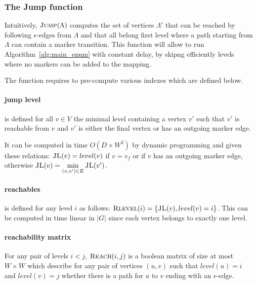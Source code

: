 \documentclass[11px]{article}
\theoremstyle{definition}
\begin{document}
      \subsubsection{The Jump function}

        Intuitively, $\Call{Jump}{\Lambda}$ computes the set of vertices
        $\Lambda'$ that can be reached by following $\epsilon$-edges from
        $\Lambda$ and that all belong first level where a path starting from
        $\Lambda$ can contain a marker transition. This function will allow to
        run Algorithm~\ref{alg:main_enum} with constant delay, by skipng
        efficiently levels where no markers can be added to the mapping.

        The  function requires to pre-compute various indexes
        which are defined below.

        \paragraph{jump level}

           is defined for all $v \in V$ the minimal level
          containing a vertex $v'$ such that $v'$ is reachable from $v$ and
          $v'$ is either the final vertex or has an outgoing marker edge.

          It can be computed in time $O(D \times W^2)$ by dynamic programming
          and given these relations: $\Call{JL}{v} = level(v)$ if $v = v_f$ or
          if $v$ has an outgoing marker edge, otherwise $\Call{JL}{v} =
          \min\limits_{(v, v') \in E} \Call{JL}{v'}$.

        \paragraph{reachables}

           is defined for any level $i$ as follows:
          $\Call{Rlevel}{i} = \{\Call{JL}{v}, level(v) = i\}$. This can be
          computed in time linear in $|G|$ since each vertex belongs to exactly
          one level.

        \paragraph{reachability matrix}

          For any pair of levels $i < j$, $\Call{Reach}{i,j}$ is a boolean
          matrix of size at most $W \times W$ which describe for any pair of
          vertices $(u, v)$ such that $level(u) = i$ and $level(v) = j$ whether
          there is a path for $u$ to $v$ ending with an $\epsilon$-edge.
\end{document}
